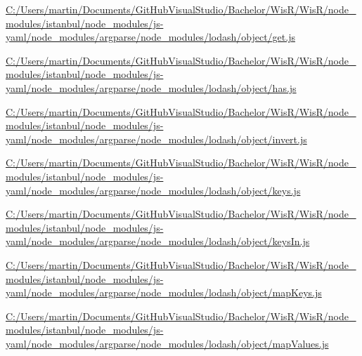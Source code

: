 \begin{DoxyCompactItemize}
\item 
\hyperlink{_c_1_2_users_2martin_2_documents_2_git_hub_visual_studio_2_bachelor_2_wis_r_2_wis_r_2node_module76079b5a6a6abf5431aae7fbf4866e46}{C\+:/\+Users/martin/\+Documents/\+Git\+Hub\+Visual\+Studio/\+Bachelor/\+Wis\+R/\+Wis\+R/node\+\_\+modules/istanbul/node\+\_\+modules/js-\/yaml/node\+\_\+modules/argparse/node\+\_\+modules/lodash/object/get.\+js}
\item 
\hyperlink{_c_1_2_users_2martin_2_documents_2_git_hub_visual_studio_2_bachelor_2_wis_r_2_wis_r_2node_module083339dec4b03ba327d0bc0b562b0f4d}{C\+:/\+Users/martin/\+Documents/\+Git\+Hub\+Visual\+Studio/\+Bachelor/\+Wis\+R/\+Wis\+R/node\+\_\+modules/istanbul/node\+\_\+modules/js-\/yaml/node\+\_\+modules/argparse/node\+\_\+modules/lodash/object/has.\+js}
\item 
\hyperlink{_c_1_2_users_2martin_2_documents_2_git_hub_visual_studio_2_bachelor_2_wis_r_2_wis_r_2node_modulea1829d168840fb4113b0be4581cb8967}{C\+:/\+Users/martin/\+Documents/\+Git\+Hub\+Visual\+Studio/\+Bachelor/\+Wis\+R/\+Wis\+R/node\+\_\+modules/istanbul/node\+\_\+modules/js-\/yaml/node\+\_\+modules/argparse/node\+\_\+modules/lodash/object/invert.\+js}
\item 
\hyperlink{_c_1_2_users_2martin_2_documents_2_git_hub_visual_studio_2_bachelor_2_wis_r_2_wis_r_2node_module8c7c2fd6be818f753952181a2107b5b6}{C\+:/\+Users/martin/\+Documents/\+Git\+Hub\+Visual\+Studio/\+Bachelor/\+Wis\+R/\+Wis\+R/node\+\_\+modules/istanbul/node\+\_\+modules/js-\/yaml/node\+\_\+modules/argparse/node\+\_\+modules/lodash/object/keys.\+js}
\item 
\hyperlink{_c_1_2_users_2martin_2_documents_2_git_hub_visual_studio_2_bachelor_2_wis_r_2_wis_r_2node_module1ab5f0c2456379d8d072b0cea26790fe}{C\+:/\+Users/martin/\+Documents/\+Git\+Hub\+Visual\+Studio/\+Bachelor/\+Wis\+R/\+Wis\+R/node\+\_\+modules/istanbul/node\+\_\+modules/js-\/yaml/node\+\_\+modules/argparse/node\+\_\+modules/lodash/object/keys\+In.\+js}
\item 
\hyperlink{_c_1_2_users_2martin_2_documents_2_git_hub_visual_studio_2_bachelor_2_wis_r_2_wis_r_2node_module996dbed9b6932ad7b213a90e4736713a}{C\+:/\+Users/martin/\+Documents/\+Git\+Hub\+Visual\+Studio/\+Bachelor/\+Wis\+R/\+Wis\+R/node\+\_\+modules/istanbul/node\+\_\+modules/js-\/yaml/node\+\_\+modules/argparse/node\+\_\+modules/lodash/object/map\+Keys.\+js}
\item 
\hyperlink{_c_1_2_users_2martin_2_documents_2_git_hub_visual_studio_2_bachelor_2_wis_r_2_wis_r_2node_moduled7c39335c1b0db6ef1c19fba989f3a13}{C\+:/\+Users/martin/\+Documents/\+Git\+Hub\+Visual\+Studio/\+Bachelor/\+Wis\+R/\+Wis\+R/node\+\_\+modules/istanbul/node\+\_\+modules/js-\/yaml/node\+\_\+modules/argparse/node\+\_\+modules/lodash/object/map\+Values.\+js}

\end{DoxyCompactItemize}
